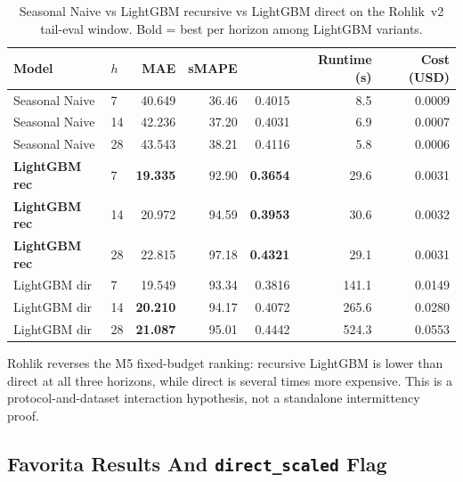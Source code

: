 \begin{table}[htbp]
\centering
\caption{Seasonal Naive vs LightGBM recursive vs LightGBM direct on the
Rohlik~v2 tail-eval window.  Bold = best per horizon among LightGBM
variants.}
\label{tab:t54}
\small
\begin{tabular}{llrrrrr}
\toprule
Model & $h$ & MAE & sMAPE & \WAPE{} & Runtime (s) & Cost (USD) \\
\midrule
Seasonal Naive &  7 & 40.649 & 36.46 & 0.4015 &   8.5 & 0.0009 \\
Seasonal Naive & 14 & 42.236 & 37.20 & 0.4031 &   6.9 & 0.0007 \\
Seasonal Naive & 28 & 43.543 & 38.21 & 0.4116 &   5.8 & 0.0006 \\
\textbf{LightGBM rec} &  7 & \textbf{19.335} & 92.90 & \textbf{0.3654} &  29.6 & 0.0031 \\
\textbf{LightGBM rec} & 14 & 20.972 & 94.59 & \textbf{0.3953} &  30.6 & 0.0032 \\
\textbf{LightGBM rec} & 28 & 22.815 & 97.18 & \textbf{0.4321} &  29.1 & 0.0031 \\
LightGBM dir &  7 & 19.549 & 93.34 & 0.3816 & 141.1 & 0.0149 \\
LightGBM dir & 14 & \textbf{20.210} & 94.17 & 0.4072 & 265.6 & 0.0280 \\
LightGBM dir & 28 & \textbf{21.087} & 95.01 & 0.4442 & 524.3 & 0.0553 \\
\bottomrule
\end{tabular}
\end{table}

Rohlik reverses the M5 fixed-budget \WAPE{} ranking: recursive LightGBM is
lower than direct at all three horizons, while direct is several times more
expensive.  This is a protocol-and-dataset interaction hypothesis, not a
standalone intermittency proof.

\subsection{Favorita Results And \texttt{direct\_scaled} Flag}

